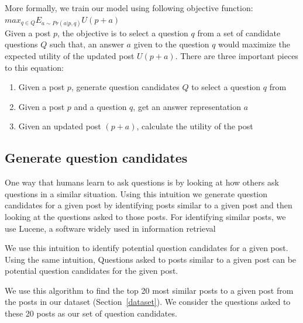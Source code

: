 \documentclass[11pt]{article}
\begin{document}
More formally, we train our model using following objective function:\\

$ max_{q \in Q}  E_{a \sim Pr(a|p,q)} U(p+a)$ \\

Given a post $p$, the objective is to select a question $q$ from a set of candidate questions $Q$ such that, an answer $a$ given to the question $q$ would maximize the expected utility of the updated post $U(p+a)$. There are three important pieces to this equation:
\begin{enumerate}
\item Given a post $p$, generate question candidates $Q$ to select a question $q$ from
\item Given a post $p$ and a question $q$, get an answer representation $a$
\item Given an updated post $(p+a)$, calculate the utility of the post 
\end{enumerate}



\subsection{Generate question candidates}\label{generate_question_candidates}

One way that humans learn to ask questions is by looking at how others ask questions in a similar situation. Using this intuition we generate question candidates for a given post by identifying posts similar to a given post and then looking at the questions asked to those posts. For identifying similar posts, we use Lucene, a software widely used in information retrieval 

We use this intuition to identify potential question candidates for a given post. 
Using the same intuition, Questions asked to posts similar to a given post can be potential question candidates for the given post. 

 We use this algorithm to find the top 20 most similar posts to a given post from the posts in our dataset (Section~\ref{dataset}). We consider the questions asked to these 20 posts as our set of question candidates. 
\end{document}
